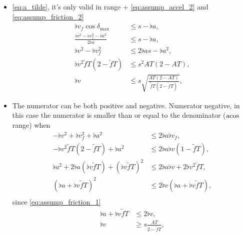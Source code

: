 \begin{itemize}
\item
\eqref{eq:a_tilde}, it's only valid in range + \eqref{eq:assump_accel_2} and \eqref{eq:assump_friction_2}
\begin{align*}
\flat{v}_f \cos\delta_{\max} &\le s - \flat{a},\\
\frac{\flat{v}^2 - \flat{v}_f^2 - \flat{a}^2}{2 \flat{a}}&\le s - \flat{a},\\
\flat{v}^2 - \flat{v}_f^2 &\le 2 \flat{a} s - \flat{a}^2,\\
\flat{v}^2 \tilde{f}T(2 - \tilde{f}T)&\le s^2 AT(2 - AT),\\
\flat{v} &\le s \sqrt{\frac{AT(2 - AT)}{\tilde{f}T(2 - \tilde{f}T)}},
\end{align*}

\item
The numerator can be both positive and negative. Numerator negative, in this case the numerator is smaller than or equal to the denominator ($\operatorname{acos}$ range) when
\begin{align*}
-\flat{v}^2 + \flat{v}_f^2 + \flat{a}^2 &\le 2 \flat{a} \flat{v}_f,\\
-\flat{v}^2 \tilde{f}T (2 - \tilde{f}T) + \flat{a}^2 &\le 2 \flat{a} \flat{v} (1 - \tilde{f}T),\\
\flat{a}^2 + 2 \flat{a} (\flat{v} \tilde{f}T) + (\flat{v} \tilde{f}T)^2 &\le 2 \flat{a} \flat{v} + 2 \flat{v}^2 \tilde{f}T,\\
(\flat{a} + \flat{v} \tilde{f}T)^2 &\le 2 \flat{v} (\flat{a} + \flat{v} \tilde{f}T),\\
\end{align*}
since \eqref{eq:assump_friction_1}
\begin{align*}
\flat{a} + \flat{v} \tilde{f}T &\le 2 \flat{v},\\
\flat{v} &\ge s \frac{AT}{2 - \tilde{f}T},\\
\end{align*}


\end{itemize}
